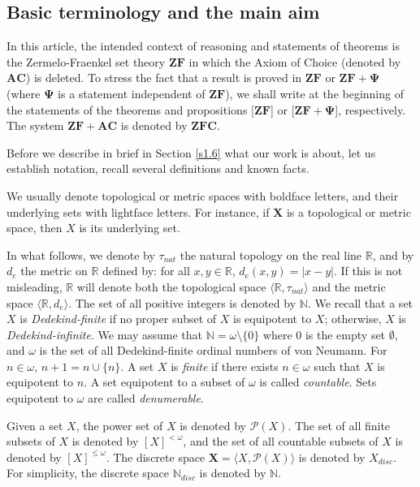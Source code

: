 \documentclass[12pt,twoside,leqno]{article}
\theoremstyle{plain}
\theoremstyle{definition}
\theoremstyle{remark}
\begin{document}
\subsection{Basic terminology and the main aim} 
\label{s1.1}
In this article, the intended context of reasoning and statements of theorems is the Zermelo-Fraenkel set theory $\mathbf{ZF}$ in which the Axiom of Choice (denoted by $\mathbf{AC}$) is deleted. To stress the fact that a result is proved in $\mathbf{ZF}$ or $\mathbf{ZF+\Psi}$ (where $\mathbf{\Psi}$ is a statement independent of $\mathbf{ZF}$), we shall write
at the beginning of the statements of the theorems and propositions [$%
\mathbf{ZF}$] or [$\mathbf{ZF+\Psi}$], respectively. The system $\mathbf{ZF+AC}$ is denoted by $\mathbf{ZFC}$. 

Before we describe in brief in Section \ref{s1.6} what our work is about, let us establish notation, recall several definitions and known facts.

We usually denote topological or metric spaces with boldface letters, and their underlying sets with lightface letters. For instance, if $\mathbf{X}$ is a topological or metric space, then $X$ is its underlying set.  

In what follows, we denote by $\tau_{nat}$ the natural topology on the real line $\mathbb{R}$, and by $d_e$ the metric on $\mathbb{R}$ defined by: for all $x,y\in\mathbb{R}$, $d_e(x,y)=|x-y|$. If this is not misleading, $\mathbb{R}$ will denote both the topological space $\langle \mathbb{R}, \tau_{nat}\rangle$ and the metric space $\langle \mathbb{R}, d_e\rangle$. The set of all positive integers is denoted by $\mathbb{N}$. We recall that a set $X$ is \emph{Dedekind-finite} if no proper subset of $X$ is equipotent to $X$; otherwise, $X$ is \emph{Dedekind-infinite}. We may assume that $\mathbb{N}=\omega\setminus\{0\}$ where $0$ is the empty set $\emptyset$, and $\omega$ is the set of all Dedekind-finite ordinal numbers of von Neumann. For $n\in\omega$, $n+1=n\cup\{n\}$. A set $X$ is \emph{finite} if there exists $n\in\omega$ such that $X$ is equipotent to $n$. A set equipotent to a subset of $\omega$ is called \emph{countable}. Sets equipotent to $\omega$ are called \emph{denumerable}.

Given a set $X$,  the power set of $X$ is denoted by $\mathcal{P}(X)$. The set of all finite subsets of $X$ is denoted by $[X]^{<\omega}$, and the set of all countable subsets of $X$ is denoted by $[X]^{\leq\omega}$.  The discrete space $\mathbf{X}=\langle X, \mathcal{P}(X)\rangle$ is denoted by $X_{disc}$.  For simplicity, the discrete space $\mathbb{N}_{disc}$ is denoted by $\mathbb{N}$.
\end{document}
